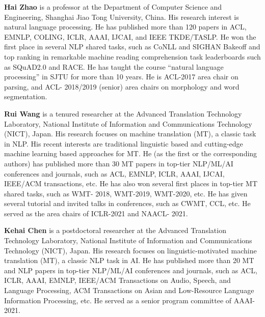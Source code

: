 \begin{bio}
  {\bfseries Hai Zhao} is a professor at the Department of Computer Science and Engineering, Shanghai Jiao Tong University, China. His research interest is natural language processing. He has published more than 120 papers in ACL, EMNLP, COLING, ICLR, AAAI, IJCAI, and IEEE TKDE/TASLP. He won the first place in several NLP shared tasks, such as CoNLL and SIGHAN Bakeoff and top ranking in remarkable machine reading comprehension task leaderboards such as SQuAD2.0 and RACE.
He has taught the course ``natural language processing'' in SJTU for more than 10 years. He is ACL-2017 area chair on parsing, and ACL- 2018/2019 (senior) area chairs on morphology and word segmentation.

  {\bfseries Rui Wang} is a tenured researcher at the Advanced Translation Technology Laboratory, National Institute of Information and Communications Technology (NICT), Japan. His research focuses on machine translation (MT), a classic task in NLP. His recent interests are traditional linguistic based and cutting-edge machine learning based approaches for MT. He (as the first or the corresponding authors) has published more than 30 MT papers in top-tier NLP/ML/AI conferences and journals, such as ACL, EMNLP, ICLR, AAAI, IJCAI, IEEE/ACM transactions, etc. He has also won several first places in top-tier MT shared tasks, such as WMT- 2018, WMT-2019, WMT-2020, etc. He has given several tutorial and invited talks in conferences, such as CWMT, CCL, etc. He served as the area chairs of ICLR-2021 and NAACL- 2021.

  {\bfseries Kehai Chen} is a postdoctoral researcher at the Advanced Translation Technology Laboratory, National Institute of Information and Communications Technology (NICT), Japan. His research focuses on linguistic-motivated machine translation (MT), a classic NLP task in AI. He has published more than 20 MT and NLP papers in top-tier NLP/ML/AI conferences and journals, such as ACL, ICLR, AAAI, EMNLP, IEEE/ACM Transactions on Audio, Speech, and Language Processing, ACM Transactions on Asian and Low-Resource Language Information Processing, etc. He served as a senior program committee of AAAI-2021.

\end{bio}

